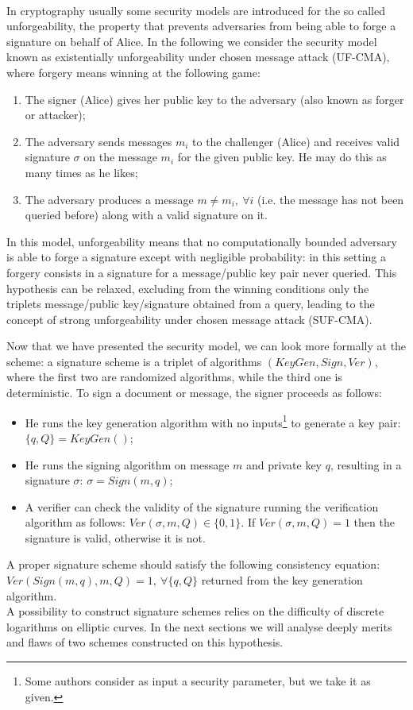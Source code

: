 \\
In cryptography usually some security models are introduced for the so called unforgeability, the property that prevents adversaries from being able to forge a signature on behalf of Alice. In the following we consider the security model known as existentially unforgeability under chosen message attack (UF-CMA), where forgery means winning at the following game:
\begin{enumerate}
	\item The signer (Alice) gives her public key to the adversary (also known as forger or attacker);
	\item The adversary sends messages $m_i$ to the challenger (Alice) and receives valid signature $\sigma$ on the message $m_i$ for the given public key. He may do this as many times as he likes;
	\item The adversary produces a message $m \neq m_i, \ \forall i$ (i.e. the message has not been queried before) along with a valid signature on it.
\end{enumerate}
In this model, unforgeability means that no computationally bounded adversary is able to forge a signature except with negligible probability: in this setting a forgery consists in a signature for a message/public key pair never queried. This hypothesis can be relaxed, excluding from the winning conditions only the triplets message/public key/signature obtained from a query, leading to the concept of strong unforgeability under chosen message attack (SUF-CMA).

\bigskip
\noindent
Now that we have presented the security model, we can look more formally at the scheme: a signature scheme is a triplet of algorithms $(KeyGen, Sign, Ver)$, where the first two are randomized algorithms, while the third one is deterministic. To sign a document or message, the signer proceeds as follows:
\begin{itemize}
	\item He runs the key generation algorithm with no inputs\footnote{Some authors consider as input a security parameter, but we take it as given.} to generate a key pair: $\{q, Q\} = KeyGen()$;
	\item He runs the signing algorithm on message $m$ and private key $q$, resulting in a signature $\sigma$: $\sigma = Sign(m, q)$;
	\item A verifier can check the validity of the signature running the verification algorithm as follows: $Ver(\sigma, m, Q) \in \{0, 1\}$. If $Ver(\sigma, m, Q) = 1$ then the signature is valid, otherwise it is not.
\end{itemize}
A proper signature scheme should satisfy the following consistency equation: $Ver(Sign(m,q), m, Q) = 1, \ \forall \{q, Q\}$ returned from the key generation algorithm.
\\
A possibility to construct signature schemes relies on the difficulty of discrete logarithms on elliptic curves. In the next sections we will analyse deeply merits and flaws of two schemes constructed on this hypothesis.


